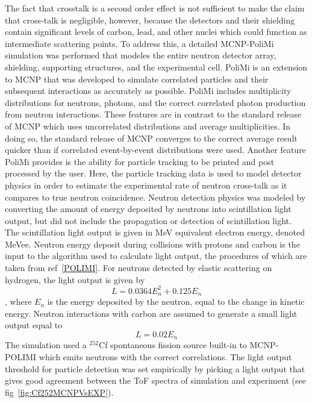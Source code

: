 The fact that crosstalk is a second order effect is not sufficient to make the claim that cross-talk is negligible, however,
because the detectors and their shielding contain significant levels of carbon, lead, and other nuclei which could function as intermediate scattering points.
To address this, a detailed MCNP-PoliMi simulation was performed that modeles the entire neutron detector array, shielding, supporting structures, and the experimental cell.
PoliMi is an extension to MCNP that was developed to simulate correlated particles and their subsequent interactions as accurately as possible.
PoliMi includes multiplicity distributions for neutrons, photons, and the correct correlated photon production from neutron interactions.
These features are in contrast to the standard release of MCNP which uses uncorrelated distributions and average multiplicities.
In doing so, the standard release of MCNP converges to the correct average result quicker than if correlated event-by-event distributions were used.
Another feature PoliMi provides is the ability for particle tracking to be printed and post processed by the user.
Here, the particle tracking data is used to model detector physics in order to estimate the experimental rate of neutron cross-talk as it compares to true neutron coincidence.
Neutron detection physics was modeled by converting the amount of energy deposited by neutrons into scintillation light output, but did not include the propagation or detection of scintillation light.
The scintillation light output is given in MeV equivalent electron energy, denoted MeVee.
Neutron energy deposit during collisions with protons and carbon is the input to the algorithm used to calculate light output, the procedures of which are taken from ref~\ref{POLIMI}.
For neutrons detected by elastic scattering on hydrogen, the light output is given by
\begin{displaymath}
L = 0.0364 E_n^2 +  0.125 E_n
\end{displaymath}
, where $E_n$ is the energy deposited by the neutron, equal to the change in kinetic energy.
Neutron interactions with carbon are assumed to generate a small light output equal to
\begin{displaymath}
L = 0.02 E_n
\end{displaymath}
The simulation used a $^{252}$Cf spontaneous fission source built-in to MCNP-POLIMI which emits neutrons with the correct correlations.
The light output threshold for particle detection was set empirically by picking a light output that gives good agreement between the ToF spectra of simulation and experiment (see fig~\ref{fig:Cf252MCNPVsEXP}).

